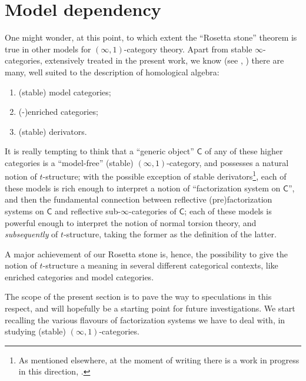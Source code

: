 \section[The Rosetta stone is model independent]{Model dependency}\label{model.dep}
One might wonder, at this point, to which extent the ``Rosetta stone'' theorem is true in other models for $(\infty,1)$\hyp{}category theory. Apart from stable $\infty$\hyp{}categories, extensively treated in the present work, we know (see , ) there are many, well suited to the description of homological algebra:
\begin{enumerate}
\item (stable) model categories;
\item (-)enriched categories;
\item (stable) derivators.
\end{enumerate}
It is really tempting to think that a ``generic object'' $\mathsf{C}$ of any of these higher categories is a ``model\hyp{}free'' (stable) $(\infty,1)$\hyp{}category, and possesses a natural notion of $t$\hyp{}structure; with the possible exception of stable derivators\footnote{As mentioned elsewhere, at the moment of writing there is a work in progress in this direction, \cite{tderivators}.}, each of these models is rich enough to interpret a notion of ``factorization system on $\mathsf C$'', and then the fundamental connection between reflective (pre)factorization systems on $\mathsf C$ and reflective sub\hyp{}$\infty$\hyp{}categories of $\mathsf C$; each of these models is powerful enough to interpret the notion of normal torsion theory, and \emph{subsequently} of $t$\hyp{}structure, taking the former as the definition of the latter.

A major achievement of our Rosetta stone  is, hence, the possibility to give the notion of $t$\hyp{}structure a meaning in several different categorical contexts, like enriched categories and model categories.

The scope of the present section is to pave the way to speculations in this respect, and will hopefully be a starting point for future investigations. We start recalling the various flavours of factorization systems we have to deal with, in studying (stable) $(\infty,1)$\hyp{}categories.
